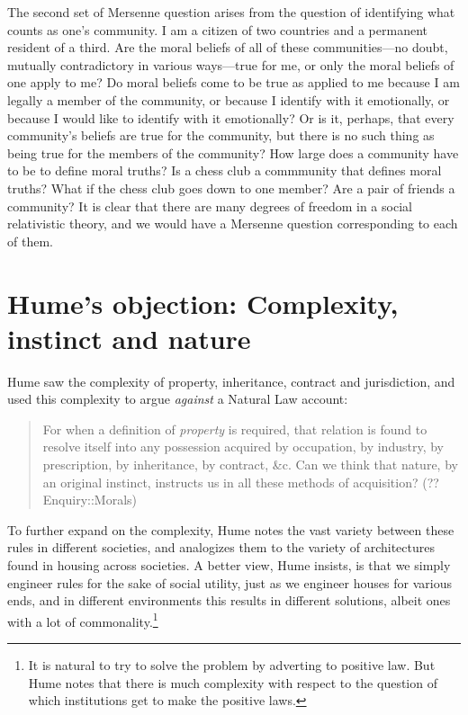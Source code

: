The second set of Mersenne question arises from the question of identifying what counts as one's community. I am a citizen of two countries
and a permanent resident of a third. Are the moral beliefs of all of these communities---no doubt, mutually contradictory in various ways---true
for me, or only the moral beliefs of one apply to me? Do moral beliefs come to be true as applied to me because I am legally a member of the community, or because I identify
with it emotionally, or because I would like to identify with it emotionally? Or is it, perhaps, that every community's beliefs are true
for the community, but there is no such thing as being true for the members of the community? 
How large does a community have to be to define moral truths? Is a chess
club a commmunity that defines moral truths? What if the chess club goes down to one member? Are a pair of friends a community? It is clear
that there are many degrees of freedom in a social relativistic theory, and we would have a Mersenne question corresponding to each of them.

\section{Hume's objection: Complexity, instinct and nature}
Hume saw the complexity of property, inheritance, contract and jurisdiction, and used this complexity to 
argue \textit{against} a Natural Law account: 
\begin{quote}
For when a definition of \textit{property} is required, that relation is found to resolve itself into any
possession acquired by occupation, by industry, by prescription, by inheritance, by contract, \&c. Can
we think that nature, by an original instinct, instructs us in all these methods of acquisition?
(??Enquiry::Morals)
\end{quote}

To further expand on the complexity, Hume notes the vast variety between these rules in different societies,
and analogizes them to the variety of architectures found in housing across societies. A better view,
Hume insists, is that we simply engineer rules for the sake of social utility, just as we engineer houses
for various ends, and in different environments this results in different solutions, albeit ones with a
lot of commonality.\footnote{It is natural to try to solve the problem by adverting to positive law. But
Hume notes that there is much complexity with respect to the question of which institutions get to make
the positive laws.}

